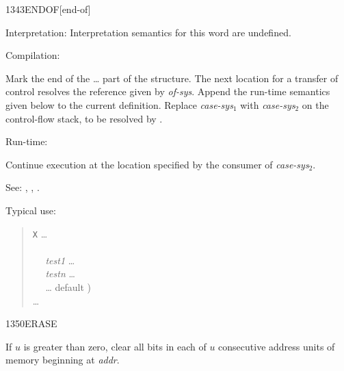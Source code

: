 \begin{newword*}{1343}{ENDOF}[end-of]
\item[Interpretation:]
	Interpretation semantics for this word are undefined.

\item[Compilation:]

	Mark the end of the \ldots{} part of the
	 structure. The next location for a transfer of
	control resolves the reference given by \emph{of-sys}. Append
	the run-time semantics given below to the current definition.
	Replace \emph{case-sys}$_1$ with \emph{case-sys}$_2$ on the
	control-flow stack, to be resolved by .

\item[Run-time:]
	\stack{}{}

	Continue execution at the location specified by the consumer
	of \emph{case-sys}$_2$.

\item[See:]
	,
	,
	.

	\begin{rationale} %
		Typical use:
		\begin{quote}
			\word{:} \texttt{X} {\ldots} \\
			\tab {} \\
			\tab~~ \emph{test1}  {\ldots}  \\
			\tab~~ \emph{testn}  {\ldots}  \\
			\tab~~ {\ldots}  default ) \\
			\tab {} {\ldots} \\
			\word{;}
		\end{quote}
	\end{rationale}
\end{newword*}


\begin{newword}{1350}{ERASE}

	If $u$ is greater than zero, clear all bits in each of $u$
	consecutive address units of memory beginning at \emph{addr}.
\end{newword}


